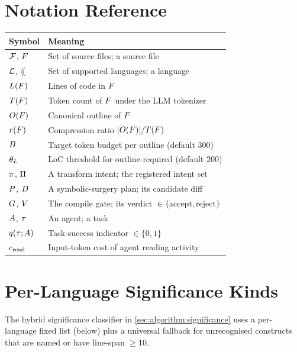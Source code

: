 \section{Notation Reference}
\label{app:notation}

\begin{center}
\begin{tabular}{ll}
\toprule
Symbol & Meaning \\
\midrule
$\mathcal{F}$, $F$            & Set of source files; a source file \\
$\mathcal{L}$, $\lang$            & Set of supported languages; a language \\
$L(F)$                  & Lines of code in $F$ \\
$T(F)$                 & Token count of $F$ under the LLM tokenizer \\
$O(F)$              & Canonical outline of $F$ \\
$r(F)$                & Compression ratio $|O(F)|/T(F)$ \\
$B$                      & Target token budget per outline (default $300$) \\
$\theta_{L}$                   & LoC threshold for outline-required (default $200$) \\
$\pi$, $\Pi$        & A transform intent; the registered intent set \\
$P$, $D$               & A symbolic-surgery plan; its candidate diff \\
$G$, $V$            & The compile gate; its verdict $\in \{\text{accept},\text{reject}\}$ \\
$A$, $\tau$              & An agent; a task \\
$q(\tau; A)$      & Task-success indicator $\in \{0, 1\}$ \\
$c_\text{read}$            & Input-token cost of agent reading activity \\
\bottomrule
\end{tabular}
\end{center}

\section{Per-Language Significance Kinds}
\label{app:significance}

The hybrid significance classifier in \cref{sec:algorithm:significance}
uses a per-language fixed list (below) plus a universal fallback for
unrecognised constructs that are named or have line-span $\geq 10$.

